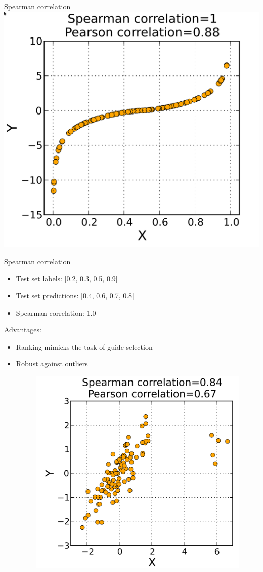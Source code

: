 \documentclass[Nike]{tuberlinbeamer}
\begin{document}

\begin{frame}{Spearman correlation}
  \includegraphics[width=0.50\linewidth]{./Spearman1.png}
\end{frame}

\begin{frame}{Spearman correlation}
  \begin{itemize}
    \item Test set labels: [0.2, 0.3, 0.5, 0.9]
    \item Test set predictions: [0.4, 0.6, 0.7, 0.8]
    \item Spearman correlation: 1.0
  \end{itemize}
  \pause
  \vspace{0.3cm}
  {\large Advantages:}
  \begin{itemize}
    \item Ranking mimicks the task of guide selection
    \pause
    \item Robust against outliers
    \begin{figure}
      \includegraphics[width=0.30\linewidth]{./Spearman2.png}
    \end{figure}
  \end{itemize}
\end{frame}
\end{document}
